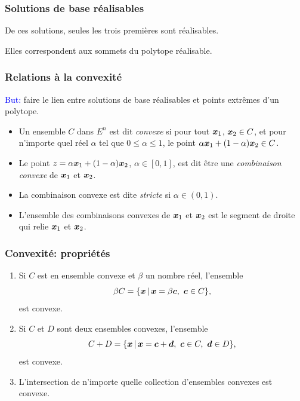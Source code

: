 \documentclass[usepdftitle=false]{beamer}
\begin{document}
\begin{frame}
\frametitle{Solutions de base réalisables}

De ces solutions, seules les trois premières sont réalisables.

\mbox{}

Elles correspondent aux sommets du polytope réalisable.

\end{frame}

\begin{frame}
\frametitle{Relations à la convexité}

\textcolor{blue}{But:} faire le lien entre solutions de base réalisables et points extrêmes d'un polytope.

\begin{itemize}
	\item
	Un ensemble $C$ dans $E^n$ est dit {\it convexe} si pour tout ${\boldsymbol{x}}_1$, ${\boldsymbol{x}}_2 \in C$, et pour n'importe quel réel $\alpha$ tel que $0 \leq \alpha \leq 1$, le point $\alpha {\boldsymbol{x}}_1 + (1-\alpha) {\boldsymbol{x}}_2 \in C$.
	\item
Le point $z = \alpha {\boldsymbol{x}}_1 + (1-\alpha) {\boldsymbol{x}}_2$, $\alpha \in [0, 1]$, est dit être une {\it combinaison convexe} de ${\boldsymbol{x}}_1$ et ${\boldsymbol{x}}_2$.
	\item
La combinaison convexe est dite {\it stricte} si $\alpha \in (0, 1)$.
	\item
L'ensemble des combinaisons convexes de ${\boldsymbol{x}}_1$ et ${\boldsymbol{x}}_2$ est le segment de droite qui relie ${\boldsymbol{x}}_1$ et ${\boldsymbol{x}}_2$.
\end{itemize}

\end{frame}

\begin{frame}
\frametitle{Convexité: propriétés}

\begin{enumerate}
	\item
	Si $C$ est en ensemble convexe et $\beta$ un nombre réel, l'ensemble
	\[
	\beta C = \lbrace {\boldsymbol{x}} \,|\, {\boldsymbol{x}} = \beta {\boldsymbol{c}},\ {\boldsymbol{c}} \in C \rbrace,
	\]
	est convexe.
	\item
	Si $C$ et $D$ sont deux ensembles convexes, l'ensemble
	\[
	C + D = \lbrace {\boldsymbol{x}} \,|\, {\boldsymbol{x}} = {\boldsymbol{c}} + {\boldsymbol{d}},\ {\boldsymbol{c}} \in C,\ {\boldsymbol{d}} \in D \rbrace,
	\]
	est convexe.
	\item
	L'intersection de n'importe quelle collection d'ensembles convexes est convexe.
\end{enumerate}

\end{frame}
\end{document}
